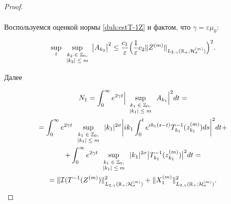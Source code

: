 \begin{proof}
\begin{multline}
\end{multline}

Воспользуемся оценкой нормы \eqref{duh:estT-1Z} и фактом, что $\gamma=\varepsilon \mu_0$:

\begin{equation}

\sup_{t}\sup_{\scriptsize \begin{array}{c} k_2\in \mathbb Z_0, \\ |k_2|\le m \end{array}}

\bigl|A_{k_2}\bigr|^2\le\frac{c_1}{\varepsilon} \Bigl(\frac1\varepsilon c_2 \|Z^{(m)} \|_{L_{2,\gamma}(\mathbb R_{+};{\cal H}^{(m)}_{\sigma})}\Bigr)^2.

\label{duh:estint}

\end{equation}

Далее

\begin{multline}

N_1=\int_0^\infty e^{2\gamma t} \Bigl| \sup_{\scriptsize \begin{array}{c} k_1\in \mathbb Z_0, \\ |k_1|\le m \end{array}}A_{k_1} \Bigr|^2dt=

\\

=\int_0^\infty e^{2\gamma t} 

\sup_{\scriptsize \begin{array}{c} k_1\in \mathbb Z_0, \\ |k_1|\le m \end{array}}|k_1|^{2\sigma}

\biggl|ik_1\int_0^t e^{ik_1(s-t)}T^{-1}_{k_1}( z_{k_1}^{(m)})ds \biggr|^2dt+

\\

+\int_0^\infty e^{2\gamma t} 

\sup_{\scriptsize \begin{array}{c} k_1\in \mathbb Z_0, \\ |k_1|\le m \end{array}}|k_1|^{2\sigma}

\bigl|T^{-1}_{k_1}( z_{k_1}^{(m)}) \bigr|^2dt=

\\

=\|{\cal I}(T^{-1}(Z^{(m)})\|^2_{L_{2,\gamma}(\mathbb R_{+};{\cal H}^{(m)}_{\sigma})}+\|X_1^{(m)}\|^2_{L_{2,\gamma}(\mathbb R_{+};{\cal H}^{(m)}_{\sigma})}.


\end{multline}
\end{proof}
